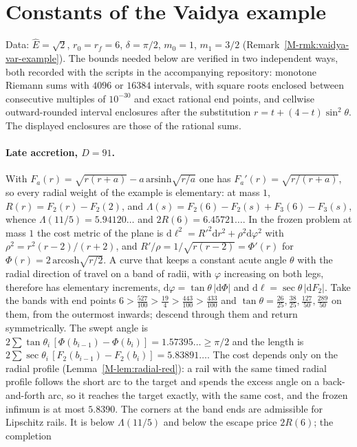 \documentclass[aip,jmp,amsmath,amssymb,reprint]{revtex4-2}
\newcommand{\Ehat}{\hat E}
\newcommand{\dd}{\mathrm{d}}
\theoremstyle{plain}
\theoremstyle{definition}
\begin{document}
\section{Constants of the Vaidya example}
\label{sec:supp-vaidya}
Data: $\Ehat=\sqrt2$, $r_0=r_f=6$, $\delta=\pi/2$, $m_0=1$, $m_1=3/2$ (Remark~\ref{M-rmk:vaidya-var-example}). The bounds needed below are verified in two independent ways, both recorded with the scripts in the accompanying
repository: monotone Riemann sums with $4096$ or $16384$ intervals, with square roots enclosed between consecutive
multiples of $10^{-30}$ and exact rational end points, and cellwise outward-rounded interval enclosures after the
substitution $r=t+(4-t)\sin^2\theta$. The displayed enclosures are those of the rational sums.

\paragraph{Late accretion, $D=91$.} With $F_a(r)=\sqrt{r(r+a)}-a\,\mathrm{arsinh}\sqrt{r/a}$ one has $F_a'(r)=\sqrt{r/(r+a)}$,
so every radial weight of the example is elementary: at mass $1$, $R(r)=F_2(r)-F_2(2)$, and
$\Lambda(s)=F_2(6)-F_2(s)+F_3(6)-F_3(s)$, whence $\Lambda(11/5)=5.94120\ldots$ and $2R(6)=6.45721\ldots$. In the frozen problem at
mass $1$ the cost metric of the plane is $\dd\ell^2=R'^2\dd r^2+\rho^2\dd\varphi^2$ with $\rho^2=r^2(r-2)/(r+2)$, and
$R'/\rho=1/\sqrt{r(r-2)}=\Phi'(r)$ for $\Phi(r)=2\,\mathrm{arcosh}\sqrt{r/2}$. A curve that keeps a constant acute angle $\theta$ with
the radial direction of travel on a band of radii, with $\varphi$ increasing on both legs, therefore has elementary
increments, $\dd\varphi=\tan\theta\,|\dd\Phi|$ and $\dd\ell=\sec\theta\,|\dd F_2|$. Take the bands with end points
$6>\frac{527}{100}>\frac{19}{4}>\frac{443}{100}>\frac{433}{100}$ and $\tan\theta=\frac{26}{25},\frac{38}{25},\frac{127}{50},\frac{289}{50}$ on them, from the
outermost inwards; descend through them and return symmetrically. The swept angle is
$2\sum\tan\theta_i\,[\Phi(b_{i-1})-\Phi(b_i)]=1.57395\ldots\ge\pi/2$ and the length is
$2\sum\sec\theta_i\,[F_2(b_{i-1})-F_2(b_i)]=5.83891\ldots$. The cost depends only on the radial profile
(Lemma~\ref{M-lem:radial-red}): a rail with the same timed radial profile follows the short arc to the target and
spends the excess angle on a back-and-forth arc, so it reaches the target exactly, with the same cost, and
the frozen infimum is at most $5.8390$. The corners at the band ends are admissible for Lipschitz rails. It is below $\Lambda(11/5)$ and below the escape price $2R(6)$; the completion
\end{document}
